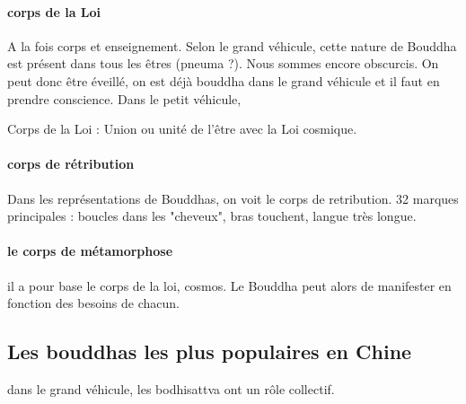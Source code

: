 \paragraph{corps de la Loi} A la fois corps et enseignement. Selon le grand véhicule, cette nature de Bouddha est présent dans tous les êtres (pneuma ?). Nous sommes encore obscurcis. On peut donc être éveillé, on est déjà bouddha dans le grand véhicule et il faut en prendre conscience. Dans le petit véhicule, 

Corps de la Loi : Union ou unité de l'être avec la Loi cosmique.


\paragraph{corps de rétribution} Dans les représentations de Bouddhas, on voit le corps de retribution. 32 marques principales : boucles dans les "cheveux", bras touchent, langue très longue.

 

\paragraph{le corps de métamorphose} il a pour base le corps de la loi, cosmos. Le Bouddha peut alors de manifester en fonction des besoins de chacun. 

\subsection{Les bouddhas les plus populaires en Chine}

\begin{Prop}
    dans le grand véhicule, les bodhisattva ont un rôle collectif.
\end{Prop}

